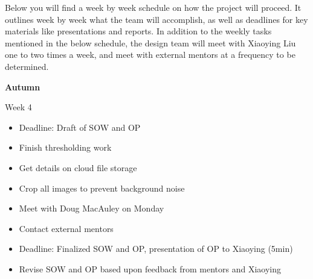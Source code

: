 \documentclass[12pt]{amsart}
\begin{document}
\begin{figure}[h]
\begin{center}
\end{center}
\end{figure}


Below you will find a week by week schedule on how the project will proceed. It outlines week by week what the team will accomplish, as well as deadlines for key materials like presentations and reports. In addition to the weekly tasks mentioned in the below schedule, the design team will meet with Xiaoying Liu one to two times a week, and meet with external mentors at a frequency to be determined. 

\begin{center}
\textbf{Autumn}
\end{center}

Week 4
\vspace*{-11pt}
\begin{itemize}
	\item Deadline: Draft of SOW and OP
	\item Finish thresholding work
	\item Get details on cloud file storage
	\item Crop all images to prevent background noise 
	\item Meet with Doug MacAuley on Monday
	\item Contact external mentors
	\item Deadline: Finalized SOW and OP, presentation of OP to Xiaoying (5min)
	\item Revise SOW and OP based upon feedback from mentors and Xiaoying
\end{itemize}
\end{document}
